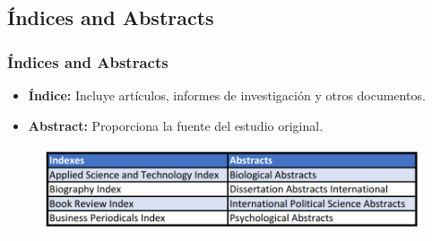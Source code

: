 \documentclass{beamer}
\begin{document}
    \subsection{\'Indices and Abstracts}
    \begin{frame}
    \frametitle{\'Indices and Abstracts}
        \begin{multicols}{2}  
            \begin{itemize}
                \item \textbf{\'Indice: } Incluye art\'iculos, informes de investigaci\'on y otros documentos. 
            \end{itemize}
            \begin{itemize}
                \item \textbf{Abstract: } Proporciona la fuente del estudio original. 
            \end{itemize}  
        \end{multicols}
        \begin{figure}
            \includegraphics[scale=0.45]{figures/index}       
        \end{figure}  
    \end{frame}
\end{document}
